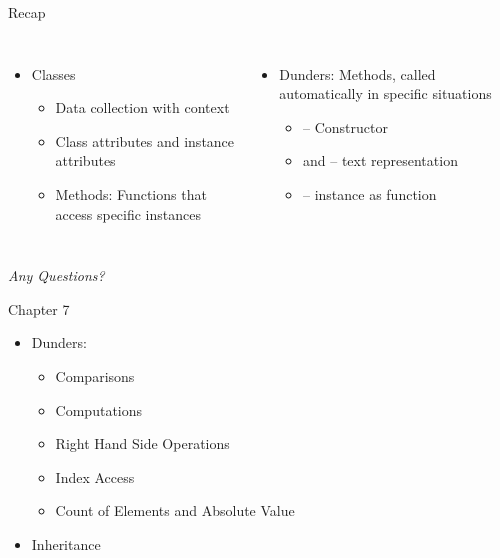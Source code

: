 
\begin{frame}[t,plain]
\titlepage
\end{frame}


\begin{frame}{Recap}
%
\begin{columns}[T]
\begin{itemize}
\item Classes
	\begin{itemize}
	\item Data collection with context
	\item Class attributes and instance attributes
	\item Methods: Functions that access specific instances
	\end{itemize}
\end{itemize}
%
\begin{itemize}
\item Dunders: Methods, called automatically in specific situations
	\begin{itemize}
	\item {} -- Constructor
	\item {} and  -- text representation
	\item {} -- instance as function
	\end{itemize}
\end{itemize}

\end{columns}
%
\begin{center}
	\emph{Any Questions?}
\end{center}
%
\end{frame}


\begin{frame}[fragile]{Chapter 7}
%
\begin{itemize}
\item Dunders: 
	\begin{itemize}
	\item Comparisons
	\item Computations
	\item Right Hand Side Operations
	\item Index Access
	\item Count of Elements and Absolute Value
	\end{itemize}
\item Inheritance
\end{itemize}
%
\end{frame}

